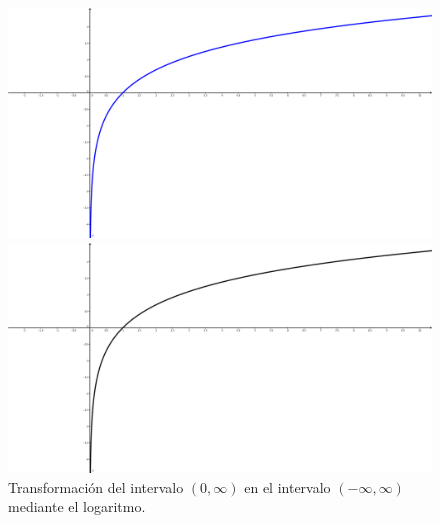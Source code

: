 \begin{figure}[bth]
\begin{center}
\begin{enColor}
\includegraphics[width=13cm]{../fig/Cap13-GraficaLogaritmo.png}
\end{enColor}
\begin{bn}			
\includegraphics[width=13cm]{../fig/Cap13-GraficaLogaritmo-bn.png}
\end{bn}
\caption{Transformación del intervalo $(0, \infty)$ en el intervalo $(-\infty, \infty)$ mediante el logaritmo.}
\label{cap13:fig:GraficaLogaritmo}
\end{center}
\end{figure}

